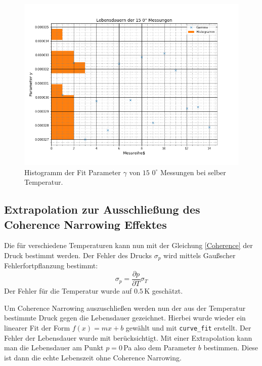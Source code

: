 \begin{figure}[ht]
\includegraphics[scale=0.5]{Bild/gammas_hist}
\centering
\caption[Histogramm zur Bestimmung der Fehler]{Histogramm der Fit Parameter $\gamma$ von $15$ $0^\circ$ Messungen bei selber Temperatur.}
\label{Fail}
\end{figure}
\subsection{Extrapolation zur Ausschließung des Coherence Narrowing Effektes}
Die für verschiedene Temperaturen kann nun mit der Gleichung \ref{Coherence} der Druck bestimmt werden. Der Fehler des Drucks $\sigma_p$ wird mittels Gaußscher Fehlerfortpflanzung bestimmt:
\begin{equation}
\sigma_p = \frac{\partial p}{\partial T} \sigma_T
\end{equation}
Der Fehler für die Temperatur wurde auf $0.5\,$K geschätzt.\par
Um Coherence Narrowing auszuschließen werden nun der aus der Temperatur bestimmte Druck gegen die Lebensdauer gezeichnet. Hierbei wurde wieder ein linearer Fit der Form $f(x)=mx+b$ gewählt und mit \verb|curve_fit| erstellt. Der Fehler der Lebensdauer wurde mit berücksichtigt. Mit einer Extrapolation kann man die Lebensdauer am Punkt $p=0\,$Pa also dem Parameter $b$ bestimmen. Diese ist dann die echte Lebenszeit ohne Coherence Narrowing. 
